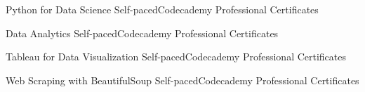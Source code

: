 
\resumeSubheading
{Python for Data Science}
{}{Self-paced}{Codecademy Professional Certificates}

\resumeSubheading
{Data Analytics}
{}{Self-paced}{Codecademy Professional Certificates}

\resumeSubheading
{Tableau for Data Visualization}
{}{Self-paced}{Codecademy Professional Certificates}

\resumeSubheading
{Web Scraping with BeautifulSoup}
{}{Self-paced}{Codecademy Professional Certificates}


%
%
%
%
%
%
